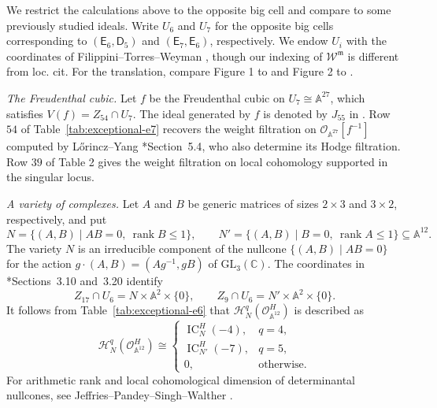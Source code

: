 \documentclass[12pt]{amsart}
\theoremstyle{definition}
\numberwithin{equation}{section}
\newcommand{\m}{\mathfrak m}
\newcommand{\W}{\mathscr W}
\begin{document}
We restrict the calculations above to the opposite big cell and compare to some previously studied ideals. Write $U_6$ and $U_7$ for the opposite big cells corresponding
to $(\mathsf E_6,\mathsf D_5)$ and $(\mathsf E_7,\mathsf E_6)$,
respectively. We endow $U_i$ with the coordinates of Filippini--Torres--Weyman \cite{FTW}, though our indexing of $\W^{\m}$ is different from loc. cit. For the translation, compare Figure 1 to \cite[Figure 1]{FTW} and Figure 2 to \cite[Figure 2]{FTW}.


\smallskip
\noindent\textit{The Freudenthal cubic.}
Let $f$ be the Freudenthal cubic on $U_7\cong \mathbb A^{27}$, which satisfies $V(f)=Z_{54}\cap U_7$. The ideal generated by $f$ is denoted by $J_{55}$ in \cite{FTW}. Row $54$ of Table~\ref{tab:exceptional-e7} recovers
the weight filtration on
$\mathcal O_{\mathbb A^{27}}[f^{-1}]$
computed by L\H{o}rincz--Yang
\cite{LYsemi}*{Section~5.4}, who also determine its Hodge
filtration. Row $39$ of Table 2 gives the weight filtration on local cohomology supported in the singular locus.

\smallskip
\noindent\textit{A variety of complexes.}
Let $A$ and $B$ be generic matrices of sizes $2\times3$ and
$3\times2$, respectively, and put
\[
 N=\{(A,B)\mid AB=0,\ \operatorname{rank}B\leq1\},\qquad
 N'=\{(A,B)\mid B=0,\ \operatorname{rank}A\leq1\}
 \subseteq\mathbb A^{12}.
\]
The variety $N$ is an irreducible component of the nullcone
$\{(A,B)\mid AB=0\}$ for the action
$g\cdot(A,B)=(Ag^{-1},gB)$ of $\mathrm{GL}_3(\mathbb{C})$. The coordinates in
\cite{FTW}*{Sections~3.10 and~3.20} identify
\[
 Z_{17}\cap U_6=N\times\mathbb A^2\times\{0\},\qquad
 Z_9\cap U_6=N'\times\mathbb A^2\times\{0\}.
\]
It follows from Table~\ref{tab:exceptional-e6} that $\mathscr H_N^q(\mathcal O_{\mathbb A^{12}}^H)$ is described as
\begin{equation}
 \mathscr H_N^q(\mathcal O_{\mathbb A^{12}}^H)
 \cong
 \begin{cases}
  \operatorname{IC}_N^H(-4),&q=4,\\
  \operatorname{IC}_{N'}^H(-7),&q=5,\\
  0,&\text{otherwise}.
 \end{cases}
\end{equation} 
For arithmetic rank and local cohomological dimension of
determinantal nullcones, see Jeffries--Pandey--Singh--Walther
\cite{JPSW}.
\end{document}

